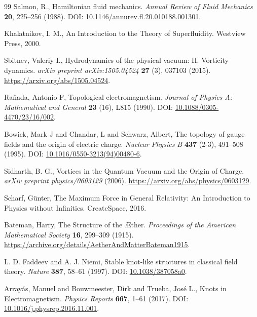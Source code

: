 \documentclass[12pt]{article}
\begin{document}
\begin{thebibliography}{99}
Salmon, R.,
\newblock Hamiltonian fluid mechanics.
\textit{Annual Review of Fluid Mechanics} \textbf{20}, 225--256 (1988).
\newblock DOI: \href{https://doi.org/10.1146/annurev.fl.20.010188.001301}{10.1146/annurev.fl.20.010188.001301}.


Khalatnikov, I. M.,
\newblock An Introduction to the Theory of Superfluidity.
\newblock Westview Press, 2000.


Sbitnev, Valeriy I.,
\newblock Hydrodynamics of the physical vacuum: II. Vorticity dynamics.
\textit{arXiv preprint arXiv:1505.04524} \textbf{27} (3), 037103 (2015).
\newblock \url{https://arxiv.org/abs/1505.04524}.


Ra\~nada, Antonio F,
\newblock Topological electromagnetism.
\textit{Journal of Physics A: Mathematical and General} \textbf{23} (16), L815 (1990).
\newblock DOI: \href{https://doi.org/10.1088/0305-4470/23/16/002}{10.1088/0305-4470/23/16/002}.


Bowick, Mark J and Chandar, L and Schwarz, Albert,
\newblock The topology of gauge fields and the origin of electric charge.
\textit{Nuclear Physics B} \textbf{437} (2-3), 491--508 (1995).
\newblock DOI: \href{https://doi.org/10.1016/0550-3213(94)00480-6}{10.1016/0550-3213(94)00480-6}.


Sidharth, B. G.,
\newblock Vortices in the Quantum Vacuum and the Origin of Charge.
\textit{arXiv preprint physics/0603129} (2006).
\newblock \url{https://arxiv.org/abs/physics/0603129}.


Scharf, Günter,
\newblock The Maximum Force in General Relativity: An Introduction to Physics without Infinities.
\newblock CreateSpace, 2016.


Bateman, Harry,
\newblock The Structure of the Æther.
\textit{Proceedings of the American Mathematical Society} \textbf{16}, 299--309 (1915).
\newblock \url{https://archive.org/details/AetherAndMatterBateman1915}.


L. D. Faddeev and A. J. Niemi,
\newblock Stable knot-like structures in classical field theory.
\textit{Nature} \textbf{387}, 58--61 (1997).
\newblock DOI: \href{https://doi.org/10.1038/387058a0}{10.1038/387058a0}.


Array\'as, Manuel and Bouwmeester, Dirk and Trueba, Jos\'e L.,
\newblock Knots in Electromagnetism.
\textit{Physics Reports} \textbf{667}, 1--61 (2017).
\newblock DOI: \href{https://doi.org/10.1016/j.physrep.2016.11.001}{10.1016/j.physrep.2016.11.001}.



\end{thebibliography}
\end{document}
